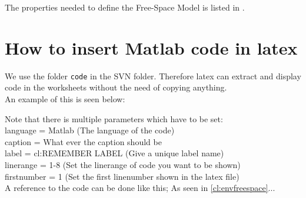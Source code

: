 The properties needed to define the Free-Space Model is listed in .  

\section{How to insert Matlab code in latex}
We use the folder \texttt{code} in the SVN folder. Therefore latex can extract and display code in the worksheets without the need of copying anything. \\

An example of this is seen below:

Note that there is multiple parameters which have to be set: \\
language        = Matlab                          (The language of the code)                 \\
caption         = What ever the caption should be                                            \\
label           = cl:REMEMBER LABEL               (Give a unique label name)                 \\
linerange       = {1-8}              (Set the linerange of code you want to be shown)        \\
firstnumber     = 1                  (Set the first linenumber shown in the latex file)      \\

A reference to the code can be done like this; As seen in \cref{cl:envfreespace}...